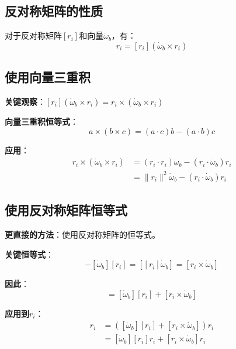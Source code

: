 \documentclass[12pt,a4paper]{article}
\begin{document}
\subsection{反对称矩阵的性质}

对于反对称矩阵$[r_i]$和向量$\dot{\omega}_b$，有：
\begin{equation}
[r_i][\dot{\omega}_b] r_i = [r_i](\dot{\omega}_b \times r_i)
\end{equation}

\subsection{使用向量三重积}

\textbf{关键观察}：$[r_i](\dot{\omega}_b \times r_i) = r_i \times (\dot{\omega}_b \times r_i)$

\textbf{向量三重积恒等式}：
\begin{equation}
a \times (b \times c) = (a \cdot c) b - (a \cdot b) c
\end{equation}

\textbf{应用}：
\begin{align}
r_i \times (\dot{\omega}_b \times r_i) &= (r_i \cdot r_i) \dot{\omega}_b - (r_i \cdot \dot{\omega}_b) r_i \\
&= \|r_i\|^2 \dot{\omega}_b - (r_i \cdot \dot{\omega}_b) r_i
\end{align}

\subsection{使用反对称矩阵恒等式}

\textbf{更直接的方法}：使用反对称矩阵的恒等式。

\textbf{关键恒等式}：
\begin{equation}
[r_i][\dot{\omega}_b] - [\dot{\omega}_b][r_i] = [[r_i]\dot{\omega}_b] = [r_i \times \dot{\omega}_b]
\end{equation}

\textbf{因此}：
\begin{equation}
[r_i][\dot{\omega}_b] = [\dot{\omega}_b][r_i] + [r_i \times \dot{\omega}_b]
\end{equation}

\textbf{应用到$r_i$}：
\begin{align}
[r_i][\dot{\omega}_b] r_i &= ([\dot{\omega}_b][r_i] + [r_i \times \dot{\omega}_b]) r_i \\
&= [\dot{\omega}_b][r_i] r_i + [r_i \times \dot{\omega}_b] r_i
\end{align}
\end{document}
